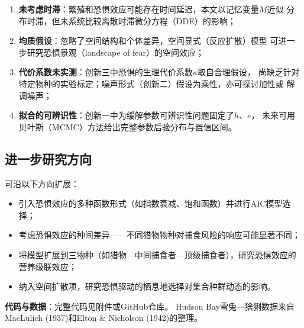 \documentclass[UTF8]{ctexart}
\begin{document}
\begin{enumerate}[leftmargin=*]
    \item \textbf{未考虑时滞}：繁殖和恐惧效应可能存在时间延迟，本文以记忆变量$M$近似
    分布时滞，但未系统比较离散时滞微分方程（DDE）的影响；
    \item \textbf{均质假设}：忽略了空间结构和个体差异，空间显式（反应扩散）模型
    可进一步研究恐惧景观（landscape of fear）的空间效应；
    \item \textbf{代价系数未实测}：创新三中恐惧的生理代价系数$\kappa$取自合理假设，
    尚缺乏针对特定物种的实验标定；噪声形式（创新二）假设为乘性，亦可探讨加性或
    解调噪声；
    \item \textbf{拟合的可辨识性}：创新一中为缓解参数可辨识性问题固定了$h$、$e$，
    未来可用贝叶斯（MCMC）方法给出完整参数后验分布与置信区间。
\end{enumerate}

\subsection{进一步研究方向}

可沿以下方向扩展：
\begin{itemize}
    \item 引入恐惧效应的多种函数形式（如指数衰减、饱和函数）并进行AIC模型选择；
    \item 考虑恐惧效应的种间差异——不同猎物物种对捕食风险的响应可能显著不同；
    \item 将模型扩展到三物种（如猎物—中间捕食者—顶级捕食者），研究恐惧效应的
    营养级联效应；
    \item 纳入空间扩散项，研究恐惧驱动的栖息地选择对集合种群动态的影响。
\end{itemize}

\vspace{1cm}

\noindent\textbf{代码与数据}：完整代码见附件或GitHub仓库。
Hudson Bay雪兔—猞猁数据来自MacLulich (1937)和Elton \& Nicholson (1942)的整理。
\end{document}
